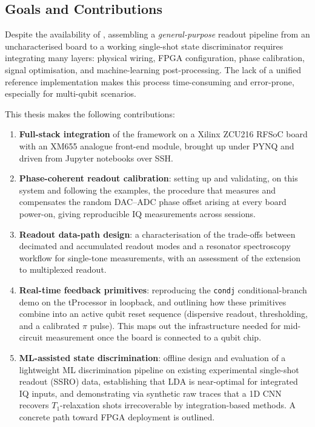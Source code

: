 \subsection{Goals and Contributions}

Despite the availability of \QICK{}, assembling a \emph{general-purpose} readout
pipeline from an uncharacterised board to a working single-shot state
discriminator requires integrating many layers: physical wiring, FPGA
configuration, phase calibration, signal optimisation, and machine-learning
post-processing.  The lack of a unified reference implementation makes this
process time-consuming and error-prone, especially for multi-qubit scenarios.

This thesis makes the following contributions:

\begin{enumerate}
      \item \textbf{Full-stack integration} of the \QICK{} framework on a Xilinx
            ZCU216 RFSoC board with an XM655 analogue front-end module, brought up
            under PYNQ and driven from Jupyter notebooks over SSH.

      \item \textbf{Phase-coherent readout calibration}: setting up and validating,
            on this system and following the \QICK{} examples, the procedure that
            measures and compensates the random DAC–ADC phase offset arising at every
            board power-on, giving reproducible IQ measurements across sessions.

      \item \textbf{Readout data-path design}: a characterisation of the trade-offs
            between decimated and accumulated readout modes and a resonator
            spectroscopy workflow for single-tone measurements, with an assessment
            of the extension to multiplexed readout.

      \item \textbf{Real-time feedback primitives}: reproducing the \QICK{}
            \texttt{condj} conditional-branch demo on the tProcessor in loopback, and
            outlining how these primitives combine into an active qubit reset sequence
            (dispersive readout, thresholding, and a calibrated $\pi$ pulse).  This
            maps out the infrastructure needed for mid-circuit measurement once the
            board is connected to a qubit chip.

      \item \textbf{ML-assisted state discrimination}: offline design and evaluation
            of a lightweight ML discrimination pipeline on existing experimental
            single-shot readout (SSRO) data, establishing that LDA is near-optimal for integrated IQ inputs, and
            demonstrating via synthetic raw traces that a 1D CNN recovers
            $T_1$-relaxation shots irrecoverable by integration-based methods.  A
            concrete path toward FPGA deployment is outlined.
\end{enumerate}

